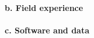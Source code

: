\documentclass{article}
\begin{document}

\paragraph{b. Field experience}


\paragraph{c. Software and data}
\end{document}
